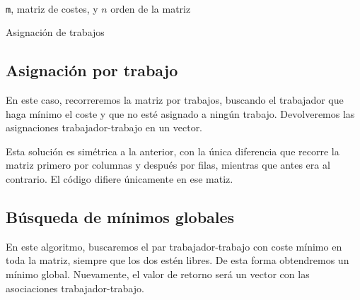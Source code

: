 \documentclass[a4paper, 11pt]{article} %
\begin{document}
		\begin{algorithm}[H]
			\begin{algorithmic}[1]
				\REQUIRE \ \\
					\texttt{m}, matriz de costes, y $n$ orden de la matriz\\
		            	\ENDIF
		            \ENDIF
		          \ENDFOR
		        \ENDFOR  	
		        
			\end{algorithmic}
		    \caption{Asignación de trabajos}
		    \label{Asignación Trabajos}
		\end{algorithm}
		
	
		\subsection{Asignación por trabajo}
		En este caso, recorreremos la matriz por trabajos, buscando el trabajador que haga mínimo el coste y que no esté
		asignado a ningún trabajo. Devolveremos las asignaciones trabajador-trabajo en un vector. 
		
		Esta solución es simétrica a la anterior, con la única diferencia que recorre la matriz  primero por columnas 
		y después por filas, mientras que antes era al contrario. El código difiere únicamente en ese matiz. 
		
		\subsection{Búsqueda de mínimos globales}
		En este algoritmo, buscaremos el par trabajador-trabajo con coste mínimo en toda la matriz, siempre que los dos estén 
		libres. De esta forma obtendremos un mínimo global. Nuevamente, el valor de retorno será un vector con las asociaciones
		trabajador-trabajo. 
		
\end{document}
